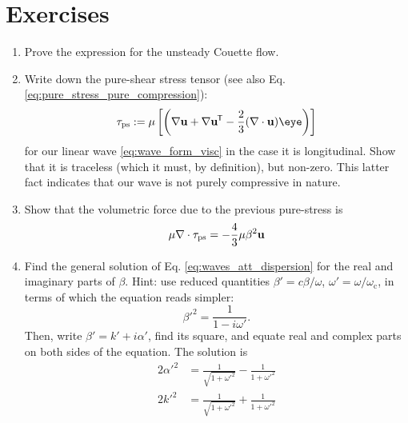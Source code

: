 \section{Exercises}

\begin{enumerate}

	\item Prove the expression for the unsteady Couette flow.
	
	\item \label{ex:shear_in_wave} Write down the pure-shear stress tensor
	(see also Eq. \ref{eq:pure_stress_pure_compression}):
	\[
	\tau_\mathrm{ps} :=
	\mu  \left[
	\left(
	\nabla\bfu + \nabla\bfu\tran  - \frac23 (\divu)  \eye
	\right)
	\right] 
	\]
	for our linear wave \ref{eq:wave_form_visc} in the case it is
	longitudinal. Show that it is traceless (which it must, by
	definition), but non-zero. This latter fact indicates that our wave
	is not purely compressive in nature.
	
	\item \label{ex:div_of_traceless} Show that the volumetric force due
	to the previous pure-stress is
	\[
	\mu \nabla \cdot  \tau_\mathrm{ps}  = -\frac43 \mu \beta^2 \mathbf{u}
	\]
	
	\item \label{ex:sound_att} Find the general solution of
	Eq. \ref{eq:waves_att_dispersion} for the real and imaginary parts
	of $\beta$. Hint: use reduced quantities $\beta'= c\beta/\omega $,
	$\omega'=\omega/\omega_\mathrm{c}$, in terms of which the equation
	reads simpler:
	\[
	\beta'^2 = \frac{1}{1-i \omega'} .
	\]
	Then, write $\beta'=k'+i \alpha'$, find its square, and equate real
	and complex parts on both sides of the equation.  The solution is
	\begin{align*}
		2\alpha'^2 &=\frac {1}{\sqrt{1+\omega'^{2}}} - \frac {1}{1+\omega'^{2}} \\
		2k'^2     &=\frac {1}{\sqrt{1+\omega'^{2}}} + \frac {1}{1+\omega'^{2}}
	\end{align*}
	
	
\end{enumerate}
